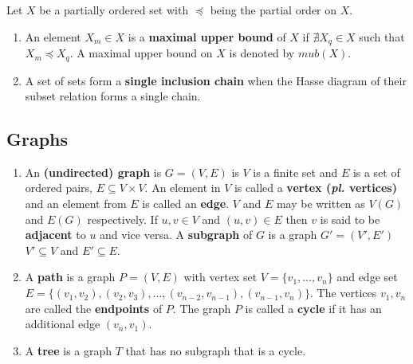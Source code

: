 \begin{definition}
  \label{def:poset}    

  Let $X$ be a partially ordered set with $\preccurlyeq$ being the
  partial order on $X$.

  \begin{enumerate}
  \hangindent {}
  \item An element $X_m \in X$ is a
    \textbf{maximal upper bound} of $X$ if $\nexists X_q \in X$ such
    that $X_m \preccurlyeq X_q$.  A maximal upper bound on $X$ is
    denoted by $mub(X)$.

  \item A set of sets form a \textbf{single
      inclusion chain} when the Hasse diagram of their subset relation
    forms a single chain.
  \end{enumerate}
\end{definition}

\subsection{Graphs}

\begin{definition}
  \label{def:graphtree}
  \begin{enumerate}
    \hangindent {}
  \item An \textbf{(undirected) graph} is $G = (V,E)$ is \stt $V$ is a
    finite set and $E$ is a set of ordered pairs, $E \subseteq V
    \times V$. An element in $V$ is called a \textbf{vertex
      (\emph{pl.} vertices)} and an element from $E$ is called an
    \textbf{edge}. $V$ and $E$ may be written as $V(G)$ and $E(G)$
    respectively. If $u,v \in V$ and $(u,v) \in E$ then $v$ is said to
    be \textbf{adjacent} to $u$ and vice versa. A \textbf{subgraph} of
    $G$ is a graph $G' = (V',E')$ \stt $V' \subseteq V$ and $E'
    \subseteq E$.

  \item A \textbf{path} is a graph $P = (V,E)$ with vertex set $V =
    \{v_1,\ldots,v_n\}$ and edge set $E= \{ (v_1,v_2),(v_2,v_3),
    \ldots,(v_{n-2},v_{n-1}),(v_{n-1},v_{n})\}$. The vertices $v_1,
    v_n$ are called the \textbf{endpoints} of $P$. The graph $P$ is
    called a \textbf{cycle} if it has an additional edge $(v_n,v_1)$.

  \item A \textbf{tree} is a graph $T$ that has no subgraph that is a
    cycle.
  \end{enumerate}
\end{definition}

